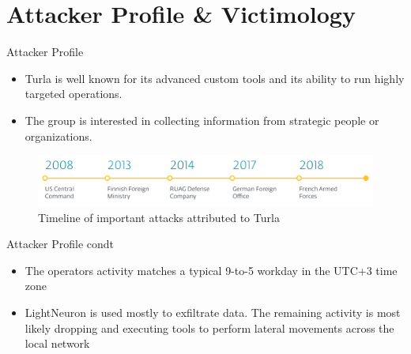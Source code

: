 \section{Attacker Profile \& Victimology}

\begin{frame}[fragile]{Attacker Profile}
  \begin{itemize}
    \item Turla is well known for its advanced custom tools and its ability to run highly targeted operations.
    \item The group is interested in collecting information from strategic people
    or organizations.
  \end{itemize}
  \begin{figure}
    \includegraphics[width=\textwidth]{figures/timeline.PNG}
    \caption{Timeline of important attacks attributed to Turla}
  \end{figure}
\end{frame}

\begin{frame}[fragile]{Attacker Profile condt}
    \begin{itemize}
      \item The operators activity matches a typical 9-to-5 workday in the UTC+3 time zone
      \item LightNeuron is used mostly to exfiltrate data. The remaining activity is most likely dropping
      and executing tools to perform lateral movements across the local network
    \end{itemize}
    \begin{figure}
      \centering
      \qquad
    \end{figure}
\end{frame}

